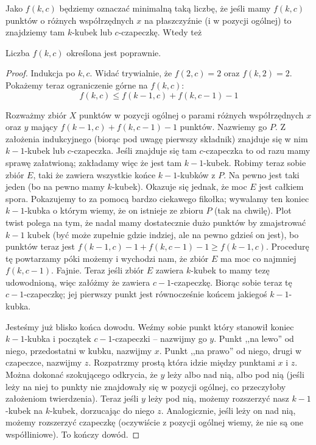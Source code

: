 Jako \(f(k,c)\) będziemy oznaczać minimalną taką liczbę, że jeśli mamy \(f(k,c)\) punktów o różnych współrzędnych \(x\) na płaszczyźnie (i w pozycji ogólnej) to znajdziemy tam \(k\)-kubek lub \(c\)-czapeczkę. Wtedy też
\begin{theorem}
	Liczba \(f(k,c)\) określona jest poprawnie.
\end{theorem}
\begin{proof}
	Indukcja po \(k,c\). Widać trywialnie, że  \(f(2,c) = 2\) oraz \(f(k,2) = 2\). Pokażemy teraz ograniczenie górne na \(f(k,c)\): \begin{equation*}
		f(k,c) \leq f(k-1,c) + f(k, c-1) - 1
	\end{equation*}

	Rozważmy zbiór \(X\) punktów w pozycji ogólnej o parami różnych współrzędnych \(x\) oraz \(y\) mający \(f(k-1,c) + f(k, c-1) - 1\) punktów. Nazwiemy go \(P\).
	Z założenia indukcyjnego (biorąc pod uwagę pierwszy składnik) znajduje się w nim \(k-1\)-kubek lub \(c\)-czapeczka. Jeśli znajduje się tam \(c\)-czapeczka to od razu mamy sprawę załatwioną; zakładamy więc że jest tam \(k-1\)-kubek. Robimy teraz sobie zbiór \(E\), taki że zawiera wszystkie końce \(k-1\)-kubków z \(P\). Na pewno jest taki jeden (bo na pewno mamy \(k\)-kubek). Okazuje się jednak, że moc \(E\) jest całkiem spora.
	Pokazujemy to za pomocą bardzo ciekawego fikołka; wywalamy ten koniec \(k-1\)-kubka o którym wiemy, że on istnieje ze zbioru \(P\) (tak na chwilę). Plot twist polega na tym, że nadal mamy dostatecznie dużo punktów by zmajstrować \(k-1\) kubek (być może zupełnie gdzie indziej, ale na pewno gdzieś on jest), bo punktów teraz jest \(f(k-1,c) - 1 + f(k, c-1) - 1 \geq f(k-1,c)\). Procedurę tę powtarzamy póki możemy i wychodzi nam, że zbiór \(E\) ma moc co najmniej \(f(k,c-1)\).
	Fajnie. Teraz jeśli zbiór \(E\) zawiera \(k\)-kubek to mamy tezę udowodnioną, więc załóżmy że zawiera \(c-1\)-czapeczkę. Biorąc sobie teraz tę \(c-1\)-czapeczkę; jej pierwszy punkt jest równocześnie końcem jakiegoś \(k-1\)-kubka.

	Jesteśmy już blisko końca dowodu. Weźmy sobie punkt który stanowił koniec \(k-1\)-kubka i początek \(c-1\)-czapeczki -- nazwijmy go \(y\). Punkt ,,na lewo'' od niego, przedostatni w kubku, nazwijmy \(x\). Punkt ,,na prawo'' od niego, drugi w czapeczce, nazwijmy \(z\). Rozpatrzmy prostą która idzie między punktami \(x\) i \(z\). Można dokonać szokującego odkrycia, że \(y\) leży albo nad nią, albo pod nią (jeśli leży na niej to punkty nie znajdowały się w pozycji ogólnej, co przeczyłoby założeniom twierdzenia). Teraz jeśli \(y\) leży pod nią, możemy rozszerzyć nasz \(k-1\)-kubek na \(k\)-kubek, dorzucając do niego \(z\).
	Analogicznie, jeśli leży on nad nią, możemy rozszerzyć czapeczkę (oczywiście z pozycji ogólnej wiemy, że nie są one współliniowe). To kończy dowód.


\end{proof}
